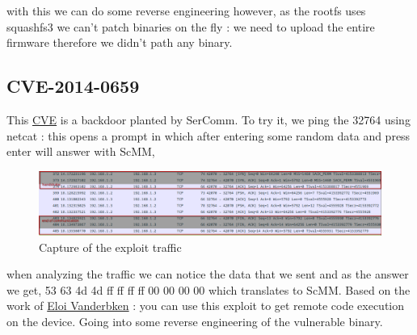 \documentclass{article}
\begin{document}
with this we can do some reverse engineering however, as the rootfs uses squashfs3 we can't patch binaries on the fly : we need to upload the entire firmware therefore we didn't path any binary.
\subsection{CVE-2014-0659}
This \href{https://nvd.nist.gov/vuln/detail/CVE-2014-0659}{CVE} is a backdoor planted by SerComm. To try it, we ping the 32764 using netcat : this opens a prompt in which after entering some random data and press enter will answer with ScMM,
\begin{figure}[!ht]
	\centering
	\includegraphics[width=\textwidth]{example.png}
	\caption{Capture of the exploit traffic}
\end{figure}
when analyzing the traffic we can notice the data that we sent and as the answer we get, 53 63 4d 4d ff ff ff ff 00 00 00 00 which translates to ScMM. Based on the work of \href{https://github.com/elvanderb/TCP-32764}{Eloi Vanderbken} : you can use this exploit to get remote code execution on the device. Going into some reverse engineering of the vulnerable binary.
\end{document}
